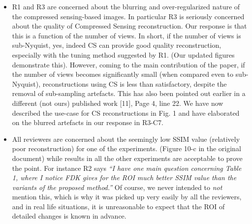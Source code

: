 \documentclass{article}
\begin{document}
\begin{itemize}
  \item R1 and R3 are concerned about the blurring and over-regularized nature of the compressed sensing-based images.  In particular R3 is seriously concerned about the quality of Compressed Sensing reconstruction. Our response is that this is a function of the number of views. In short, if the number of views is sub-Nyquist, yes, indeed CS can provide good quality reconstruction, especially with the tuning method suggested by R1. (Our updated figures demonstrate this). 
However,  coming to the main contribution of the paper, if the number of views becomes significantly small (when compared even to sub-Nyquist), reconstructions using CS is less than satisfactory, despite the removal of sub-sampling artefacts. This has also been pointed out earlier in a different (not ours) published work [11], Page 4, line 22.  We have now described the use-case for CS reconstructions in Fig. 1 and have elaborated on the blurred artefacts in our  response in R3-C7.
\item All reviewers are concerned about the seemingly low SSIM value (relatively poor reconstruction) for one of the experiments.  (Figure 10-c in the original document) while results in all the other experiments are acceptable to prove the point.  For instance R2 says \textit{``I have one main question concerning Table 1, where I notice FDK gives for the ROI much better SSIM value than the variants of the proposed method.'' } 
Of course, we never intended to \textit{not} mention this, which is why it was picked up very easily by all the reviewers, and in real life situations, it is unreasonable to expect that the ROI of detailed changes is known in advance. 


\end{itemize}
\end{document}
